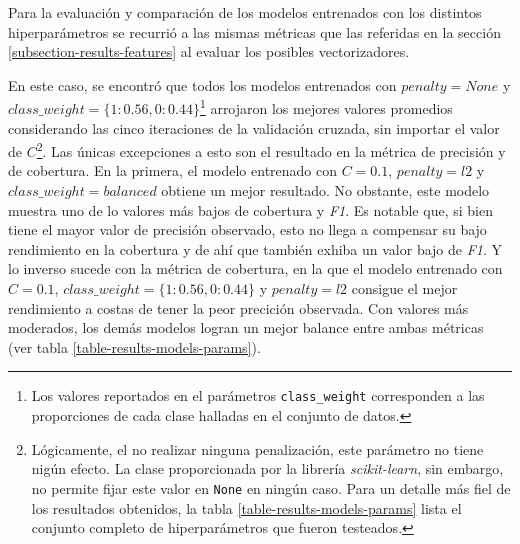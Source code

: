 Para la evaluaci\'on y comparaci\'on de los modelos entrenados con los
distintos hiperpar\'ametros se recurri\'o a las mismas m\'etricas que las
referidas en la secci\'on \ref{subsection-results-features} al evaluar
los posibles vectorizadores.
\par
En este caso, se encontr\'o que todos los modelos
entrenados con $penalty=None$ y
$class\_weight=\lbrace1:0.56,0:0.44\rbrace$\footnote{Los valores
reportados en el par\'ametros \texttt{class\_weight} corresponden a
las proporciones de cada clase halladas en el conjunto de datos.}
arrojaron los mejores valores promedios considerando las cinco iteraciones
de la validaci\'on cruzada, sin importar el valor de $C$\footnote{
Lógicamente, el no realizar ninguna penalizaci\'on, este par\'ametro no tiene
nig\'un efecto. La clase proporcionada por la librer\'ia \textit{scikit-learn},
sin embargo, no permite fijar este valor en \texttt{None} en ning\'un caso.
Para un detalle m\'as fiel de los resultados obtenidos,
la tabla \ref{table-results-models-params} lista el conjunto completo de
hiperpar\'ametros que fueron testeados.}.
Las \'unicas excepciones a esto son el resultado en la
m\'etrica de precisi\'on y de cobertura. En la primera, el modelo entrenado con
$C=0.1$, $penalty=l2$ y $class\_weight=balanced$
obtiene un mejor resultado. No obstante, este modelo muestra uno de lo valores
m\'as bajos de cobertura y \textit{F1}. Es notable que, si bien tiene el mayor
valor de precisi\'on observado, esto no llega a compensar su bajo rendimiento
en la cobertura y de ah\'i que tambi\'en exhiba un valor bajo de \textit{F1}.
Y lo inverso sucede con la m\'etrica de cobertura, en la que el modelo
entrenado con $C=0.1$, $class\_weight=\lbrace1:0.56,0:0.44\rbrace$ y
$penalty=l2$ consigue el mejor rendimiento a costas de tener la peor precici\'on
observada.
Con valores m\'as moderados, los dem\'as modelos logran un mejor balance entre
ambas m\'etricas (ver tabla \ref{table-results-models-params}).


